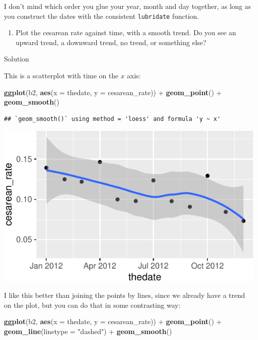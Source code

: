 \documentclass[]{tufte-book}
\newenvironment{Shaded}{}{}
\newcommand{\DataTypeTok}[1]{\textcolor[rgb]{0.56,0.13,0.00}{#1}}
\newcommand{\KeywordTok}[1]{\textcolor[rgb]{0.00,0.44,0.13}{\textbf{#1}}}
\newcommand{\NormalTok}[1]{#1}
\newcommand{\OperatorTok}[1]{\textcolor[rgb]{0.40,0.40,0.40}{#1}}
\newcommand{\StringTok}[1]{\textcolor[rgb]{0.25,0.44,0.63}{#1}}
\providecommand{\tightlist}{%
  \setlength{\itemsep}{0pt}\setlength{\parskip}{0pt}}
\theoremstyle{definition}
\theoremstyle{definition}
\theoremstyle{definition}
\theoremstyle{remark}
\begin{document}
I don't mind which order you glue your year, month and day together, as
long as you construct the dates with the consistent \texttt{lubridate}
function.

\begin{enumerate}
\def\labelenumi{(\alph{enumi})}
\setcounter{enumi}{2}
\tightlist
\item
  Plot the cesarean rate against time, with a smooth trend. Do you see
  an upward trend, a downward trend, no trend, or something else?
\end{enumerate}

Solution

This is a scatterplot with time on the \(x\) axis:

\begin{Shaded}
\begin{Highlighting}[]
\KeywordTok{ggplot}\NormalTok{(b2, }\KeywordTok{aes}\NormalTok{(}\DataTypeTok{x =}\NormalTok{ thedate, }\DataTypeTok{y =}\NormalTok{ cesarean_rate)) }\OperatorTok{+}\StringTok{ }
\StringTok{    }\KeywordTok{geom_point}\NormalTok{() }\OperatorTok{+}\StringTok{ }\KeywordTok{geom_smooth}\NormalTok{()}
\end{Highlighting}
\end{Shaded}

\begin{verbatim}
## `geom_smooth()` using method = 'loess' and formula 'y ~ x'
\end{verbatim}

\includegraphics{13-dates-and-times_files/figure-latex/unnamed-chunk-20-1}

I like this better than joining the points by lines, since we already
have a trend on the plot, but you can do that in some contrasting way:

\begin{Shaded}
\begin{Highlighting}[]
\KeywordTok{ggplot}\NormalTok{(b2, }\KeywordTok{aes}\NormalTok{(}\DataTypeTok{x =}\NormalTok{ thedate, }\DataTypeTok{y =}\NormalTok{ cesarean_rate)) }\OperatorTok{+}\StringTok{ }
\StringTok{    }\KeywordTok{geom_point}\NormalTok{() }\OperatorTok{+}\StringTok{ }\KeywordTok{geom_line}\NormalTok{(}\DataTypeTok{linetype =} \StringTok{"dashed"}\NormalTok{) }\OperatorTok{+}\StringTok{ }
\StringTok{    }\KeywordTok{geom_smooth}\NormalTok{()}
\end{Highlighting}
\end{Shaded}
\end{document}
